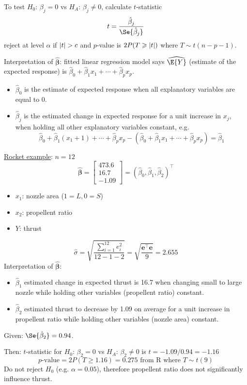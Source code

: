 To test $ H_0 $: $ \beta_j=0 $ vs $ H_A $: $ \beta_j\neq 0 $,
calculate $ t $-statistic
\[ t=\frac{\hat{\beta}_j}{\Se{\hat{\beta}_j}}  \]
reject at level $ \alpha $ if $ \lvert t\rvert>c $ and
$ p $-value is $ 2P(T\geqslant \lvert t\rvert) $ where $ T \sim t(n-p-1) $.

Interpretation of $ \hat{\symbf{\beta}} $: fitted linear
regression model says $ \widehat{\E{Y}} $
(estimate of the expected response) is
$ \hat{\beta}_0+\hat{\beta}_1x_1+\cdots+\hat{\beta}_p x_p $.
\begin{itemize}
    \item $ \hat{\beta}_0 $ is the estimate of expected response
          when all explanatory variables are equal to 0.
    \item $ \hat{\beta}_j $ is the estimated change
          in expected response for a unit increase in $ x_j $,
          when holding all other explanatory variables constant,
          e.g.\
          \[ \hat{\beta}_0+\hat{\beta}_1(x_1+1)+\cdots+\hat{\beta}_p x_p
              -(\hat{\beta}_0+\hat{\beta}_1 x_1+\cdots+\hat{\beta}_p x_p)=\hat{\beta}_1 \]
\end{itemize}

\underline{Rocket example}: $ n=12 $
\[ \hat{\symbf{\beta}}=\begin{bmatrix}
        473.6 \\
        16.7  \\
        -1.09
    \end{bmatrix}=(\hat{\beta}_0,\hat{\beta}_1,\hat{\beta}_2)^\top \]
\begin{itemize}
    \item $ x_1 $: nozzle area ($ 1 = L,0=S $)
    \item $ x_2 $: propellent ratio
    \item $ Y $: thrust
\end{itemize}
\[ \hat{\sigma}=\sqrt{\frac{\sum\limits_{i=1}^{12} e_i^2}{12-1-2}}=
    \sqrt{\frac{\symbf{e}^\top \symbf{e}}{9}}=
    2.655 \]
Interpretation of $ \hat{\symbf{\beta}} $:
\begin{itemize}
    \item $ \hat{\beta}_1 $ estimated change in expected thrust is 16.7
          when changing small to large nozzle while holding other variables
          (propellent ratio) constant.
    \item $ \hat{\beta}_2 $ estimated thrust to decrease by 1.09 on average
          for a unit increase in propellent ratio while holding other
          variables (nozzle area) constant.
\end{itemize}
Given: $ \Se{\hat{\beta}_2}=0.94 $.

Then: $ t $-statistic for $ H_0 $: $ \beta_2=0 $ vs $ H_A $: $ \beta_2\neq 0 $
is $ t=-1.09/0.94=-1.16 $
\[ p\text{-value}=2P(T\geqslant 1.16)=0.275\text{ from R where } T \sim t(9)\]
Do not reject $ H_0 $ (e.g. $ \alpha=0.05 $), therefore
propellent ratio does not significantly influence thrust.
